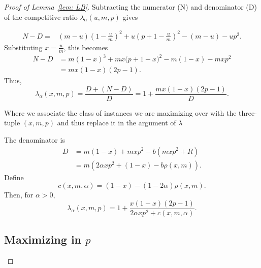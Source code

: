 \documentclass[%
english, titlepage=false %
]{./tum-templates/book/tumbook}
\begin{document}
\begin{proof}[\hypertarget{proof:LB}{Proof of Lemma~\ref{lem: LB}}]
Subtracting the numerator (N) and denominator (D) of the competitive ratio $\lambda_{\alpha}(u,m,p)$ gives

\[
\begin{aligned}
N-D
={}&
(m-u)\left(1-\frac um\right)^2
+u\left(p+1-\frac um\right)^2
-(m-u)-up^2.
\end{aligned}
\]
Substituting \(x=\frac{u}{m}\), this becomes
\[
\begin{aligned}
N-D
&=
m(1-x)^3
 +mx\bigl(p+1-x\bigr)^2
 -m(1-x)-mxp^2 \\
&=
mx(1-x)(2p-1).
\end{aligned}
\]
Thus,
\[
\lambda_{\alpha}(x,m,p)=\frac{D+(N-D)}{D}=1+\frac{mx(1-x)(2p-1)}{D}.
\]

Where we associate the class of instances we are maximizing over with the three-tuple $(x,m,p)$
and thus replace it in the argument of $\lambda$

The denominator is
\[
\begin{aligned}
D
&=
m(1-x)+mxp^2-b(mx p^2+R) \\
&=
m\left(2\alpha xp^2+(1-x)-b\rho(x,m)\right).
\end{aligned}
\]
Define
\[
        c(x,m,\alpha)=(1-x)-(1-2\alpha)\rho(x,m).
\]
Then, for \(\alpha>0\),
\[
        \lambda_{\alpha}(x,m,p)
        =
        1+
        \frac{x(1-x)(2p-1)}{2\alpha xp^2+c(x,m,\alpha)}.
\]

\subsection*{\texorpdfstring{Maximizing in \(p\)}{Maximizing in p}}


\end{proof}
\end{document}
